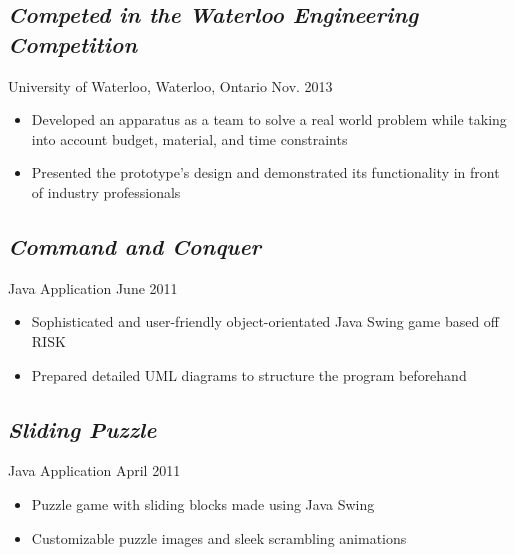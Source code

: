 \documentclass[10pt]{article}
\begin{document}
\begin{minipage}[t]{0.84\linewidth}
	\subsection*{\textit{Competed in the Waterloo Engineering Competition}} \vspace{-6pt} 
		University of Waterloo, Waterloo, Ontario \hspace{160pt} Nov. 2013
		\begin{itemize}
			\item Developed an apparatus as a team to solve a real world problem while taking into account budget, 				material, and time constraints
			\item Presented the prototype's design and demonstrated its functionality in front of industry 								professionals
		\end{itemize}	
	
	\subsection*{\textit{Command and Conquer}} \vspace{-6pt}
		Java Application \hspace{270pt} June 2011
		\begin{itemize}
			\item Sophisticated and user-friendly object-orientated Java Swing game based off RISK
			\item Prepared detailed UML diagrams to structure the program beforehand
		\end{itemize}

	\subsection*{\textit{Sliding Puzzle}} \vspace{-6pt}
		Java Application \hspace{270pt} April 2011
		\begin{itemize}
			\item Puzzle game with sliding blocks made using Java Swing
			\item Customizable puzzle images and sleek scrambling animations
		\end{itemize}
\end{minipage}
\end{document}
